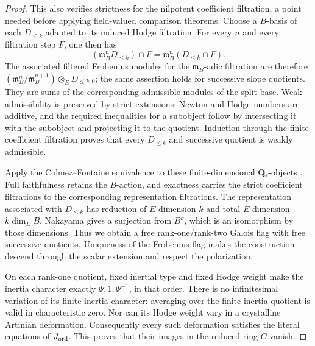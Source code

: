 \begin{proof}
This also verifies strictness for the nilpotent coefficient
filtration, a point needed before applying field-valued comparison
theorems.  Choose a $B$-basis of each $D_{\le k}$ adapted to its
induced Hodge filtration.  For every $n$ and every filtration step
$F$, one then has
\[
 (\mathfrak m_B^nD_{\le k})\cap F
                  =\mathfrak m_B^n(D_{\le k}\cap F).
\]
The associated filtered Frobenius modules for the
$\mathfrak m_B$-adic filtration are therefore
$(\mathfrak m_B^n/\mathfrak m_B^{n+1})\otimes_E D_{\le k,0}$;
the same assertion holds for successive slope quotients.  They are
sums of the corresponding admissible modules of the split base.
Weak admissibility is preserved by strict extensions: Newton and
Hodge numbers are additive, and the required inequalities for a
subobject follow by intersecting it with the subobject and projecting
it to the quotient.  Induction through the finite coefficient
filtration proves that every $D_{\le k}$ and successive quotient
is weakly admissible.

Apply the Colmez--Fontaine equivalence to these finite-dimensional
$\mathbf Q_\ell$-objects \cite{support-local-chart-CF}.  Full
faithfulness retains the $B$-action, and exactness carries the
strict coefficient filtrations to the corresponding representation
filtrations.  The representation associated with $D_{\le k}$ has
reduction of $E$-dimension $k$ and total $E$-dimension
$k\dim_E B$.  Nakayama gives a surjection from $B^k$, which is an
isomorphism by those dimensions.  Thus we obtain a free
rank-one/rank-two Galois flag with free successive quotients.
Uniqueness of the Frobenius flag makes the construction descend
through the scalar extension and respect the polarization.

On each rank-one quotient, fixed inertial type and fixed Hodge weight
make the inertia character exactly $\Psi,1,\Psi^{-1}$, in that
order.  There is no infinitesimal variation of its finite inertia
character: averaging over the finite inertia quotient is valid in
characteristic zero.  Nor can its Hodge weight vary in a crystalline
Artinian deformation.  Consequently every such deformation satisfies
the literal equations of $J_{\rm ord}$.  This proves that their
images in the reduced ring $C$ vanish.


\end{proof}
